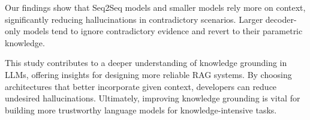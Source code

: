 Our findings show that Seq2Seq models and smaller models rely more on context, significantly reducing hallucinations in contradictory scenarios.
Larger decoder-only models tend to ignore contradictory evidence and revert to their parametric knowledge.

This study contributes to a deeper understanding of knowledge grounding in LLMs, offering insights for designing more reliable RAG systems.
By choosing architectures that better incorporate given context, developers can reduce undesired hallucinations.
Ultimately, improving knowledge grounding is vital for building more trustworthy language models for knowledge-intensive tasks.
